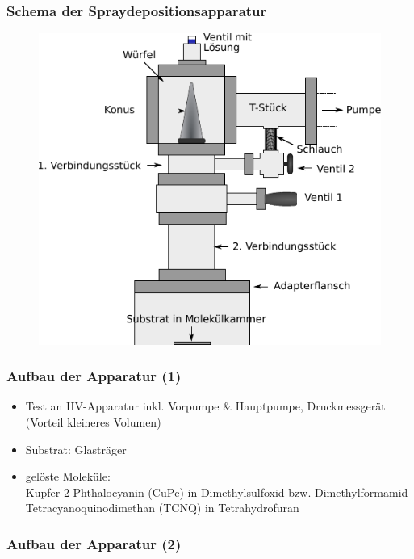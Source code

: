 \documentclass{beamer}
\begin{document}
\begin{frame}
\frametitle{Schema der Spraydepositionsapparatur}
\begin{figure}[H]
\centering
\includegraphics{bilder/wuerfelklein.pdf}
\end{figure}
\end{frame}

\begin{frame}
\frametitle{Aufbau der Apparatur (1)}
\begin{itemize}\setlength{\itemsep}{+15pt}
  \item Test an HV-Apparatur inkl. Vorpumpe $\&$ Hauptpumpe, Druckmessgerät (Vorteil kleineres
  Volumen)
  \item Substrat: Glasträger
  \item gelöste Moleküle: \\
  Kupfer-2-Phthalocyanin (CuPc) in Dimethylsulfoxid bzw. Dimethylformamid\\
  Tetracyanoquinodimethan (TCNQ) in Tetrahydrofuran
\end{itemize}
\end{frame}


\begin{frame}
\frametitle{Aufbau der Apparatur (2)}
\begin{figure}[H]
\centering

\end{figure}
\end{frame}
\end{document}
